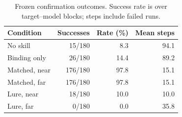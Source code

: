 \begin{table}[t]
\centering
\caption{Frozen confirmation outcomes. Success rate is over target--model blocks; steps include failed runs.}
\label{tab:main}
\begin{tabular}{lrrr}
\toprule
Condition & Successes & Rate (\%) & Mean steps \\
\midrule
No skill & 15/180 & 8.3 & 94.1 \\
Binding only & 26/180 & 14.4 & 89.2 \\
Matched, near & 176/180 & 97.8 & 15.1 \\
Matched, far & 176/180 & 97.8 & 15.1 \\
Lure, near & 18/180 & 10.0 & 10.0 \\
Lure, far & 0/180 & 0.0 & 35.8 \\
\bottomrule
\end{tabular}
\end{table}
